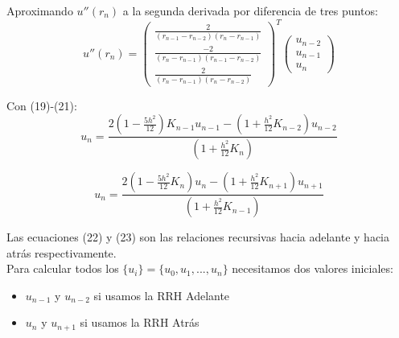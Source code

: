 \begin{frame}{}

Aproximando $u''(r_{n})$ a la segunda derivada por diferencia de tres puntos:
\begin{equation}
    u''(r_{n}) = 
    \begin{pmatrix}
        \frac{2}{(r_{n-1}-r_{n-2})(r_{n}-r_{n-1})} \\[6pt] \frac{-2}{(r_{n}-r_{n-1})(r_{n-1}-r_{n-2})} \\[6pt] \frac{2}{(r_{n}-r_{n-1})(r_{n}-r_{n-2})}
    \end{pmatrix}^{T}
    \begin{pmatrix}
        u_{n-2} \\ u_{n-1} \\ u_{n}
    \end{pmatrix}
\end{equation}

Con (19)-(21):
\begin{equation}
    u_{n} = \frac{2\left(1-\frac{5h^{2}}{12}\right)K_{n-1}u_{n-1} - \left(1+\frac{h^{2}}{12}K_{n-2}\right)u_{n-2}}{\left(1+\frac{h^{2}}{12}K_{n}\right)}
\end{equation}
    
\end{frame}

\begin{frame}{}

\begin{equation}
    u_{n} = \frac{2\left(1-\frac{5h^{2}}{12}K_{n}\right)u_{n} - \left(1+\frac{h^{2}}{12}K_{n+1}\right)u_{n+1}}{\left(1+\frac{h^{2}}{12}K_{n-1}\right)}
\end{equation}

Las ecuaciones (22) y (23) son las relaciones recursivas hacia adelante y hacia atrás respectivamente.\\

Para calcular todos los $\{u_{i}\}=\{u_{0},u_{1},...,u_{n}\}$ necesitamos dos valores iniciales:
\begin{itemize}
    \item $u_{n-1}$ y $u_{n-2}$ si usamos la RRH Adelante
    \item $u_{n}$ y $u_{n+1}$ si usamos la RRH Atrás
\end{itemize}
    
\end{frame}

